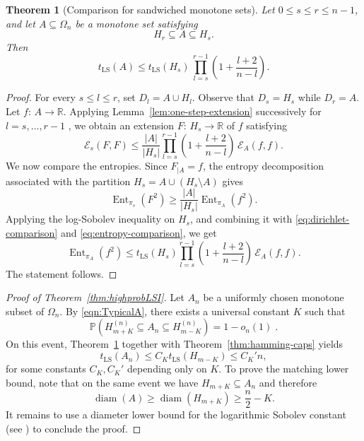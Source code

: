 \documentclass[12pt,final]{amsart}
\newcommand{\1}{\mathbf{1}}
\newtheorem{theorem}{Theorem}[section]
\newcommand{\Ent}{\operatorname{Ent}}
\newcommand{\Ecal}{\mathcal{E}}
\newcommand{\R}{\mathbb{R}}
\begin{document}
\begin{theorem}[Comparison for sandwiched monotone sets]\label{thm:sandwich-monotone-set}
    Let $0\leq s\leq r\leq n-1$, and let $A\subseteq \Omega_n$ be a monotone set satisfying 
    $$
    H_r\subseteq A\subseteq H_s. 
    $$
Then 
$$
 t_{\operatorname{LS}}(A)\leq t_{\operatorname{LS}}(H_s)\, \prod_{l=s}^{r-1} \left(1+\frac{l+2}{n-l}\right).
$$
\end{theorem}
\begin{proof}
    For every $s\leq l\leq r$, set $D_l=A\cup H_l$. Observe that $D_s=H_s$ while $D_r=A$. Let $f:\, A\to \R$. Applying Lemma~\ref{lem:one-step-extension} successively for $l=s,\ldots, r-1$ , we obtain an extension $F:\, H_s\to \R$ of $f$ satisfying 
    \begin{equation}\label{eq:dirichlet-comparison}
        \Ecal_s(F,F)\leq \frac{|A|}{|H_s|}\prod_{l=s}^{r-1} \left(1+\frac{l+2}{n-l}\right)\, \Ecal_A(f,f). 
    \end{equation}
We now compare the entropies. Since $F_{\mid A}=f$, the entropy decomposition associated with the partition $H_s=A\cup (H_s\setminus A)$ gives 
\begin{equation}\label{eq:entropy-comparison}
   \Ent_{\pi_s}(F^2)\geq \frac{|A|}{|H_s|} \Ent_{\pi_A}(f^2). 
\end{equation}
Applying the log-Sobolev inequality on $H_s$, and combining it with \eqref{eq:dirichlet-comparison} and \eqref{eq:entropy-comparison}, we get
$$
\Ent_{\pi_A}(f^2)\leq t_{\operatorname{LS}}(H_s)  \prod_{l=s}^{r-1} \left(1+\frac{l+2}{n-l}\right)\, \Ecal_A(f,f).
$$
The statement follows. 
\end{proof}


\begin{proof}[Proof of Theorem~\ref{thm:highprobLSI}]
    Let $A_n$ be a uniformly chosen monotone subset of $\Omega_n$. By \eqref{eqn:TypicalA}, there exists a universal constant $K$ such that 
$$
    \mathbb{P}(H_{m+K}^{(n)}\subseteq A_n\subseteq H_{m-K}^{(n)})=1-o_n(1)\;.
$$
On this event, Theorem~\ref{thm:sandwich-monotone-set} together with Theorem~\ref{thm:hamming-caps} yields
$$
 t_{\operatorname{LS}}(A_n)\leq C_K  t_{\operatorname{LS}}(H_{m-K})\leq C_K' n,
$$
for some constants $C_K, C_K'$ depending only on $K$. 
To prove the matching lower bound, note that on the same event we have $H_{m+K}\subseteq A_n$ and therefore 
$$
\operatorname{diam}(A)\ge \operatorname{diam}(H_{m+K})\ge \frac{n}{2}-K.
$$
It remains to use a diameter lower bound for the logarithmic Sobolev constant (see \cite[Lemma 1]{SY25}) to conclude the proof. 
\end{proof}
\end{document}

